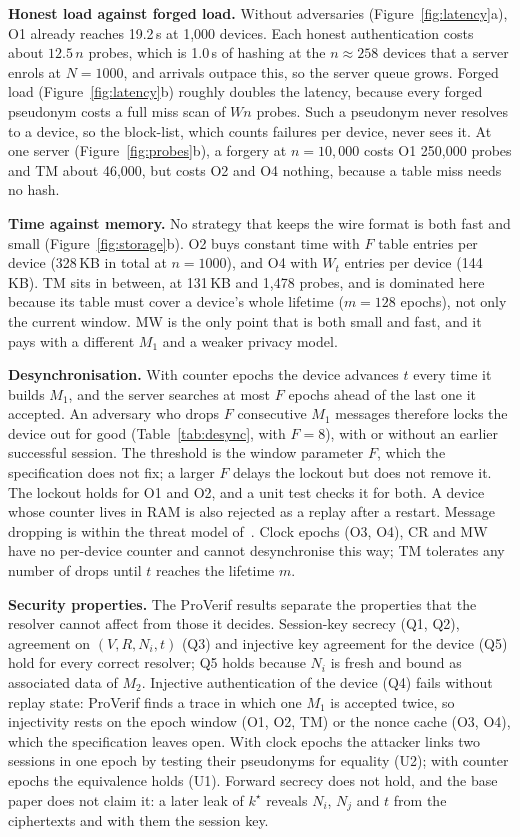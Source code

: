 \textbf{Honest load against forged load.} Without adversaries (Figure~\ref{fig:latency}a), O1 already reaches 19.2\,s at 1,000 devices. Each honest authentication costs about $12.5\,n$ probes, which is 1.0\,s of hashing at the $n\approx258$ devices that a server enrols at $N=1000$, and arrivals outpace this, so the server queue grows. Forged load (Figure~\ref{fig:latency}b) roughly doubles the latency, because every forged pseudonym costs a full miss scan of $Wn$ probes. Such a pseudonym never resolves to a device, so the block-list, which counts failures per device, never sees it. At one server (Figure~\ref{fig:probes}b), a forgery at $n=10{,}000$ costs O1 250,000 probes and TM about 46,000, but costs O2 and O4 nothing, because a table miss needs no hash.

\textbf{Time against memory.} No strategy that keeps the wire format is both fast and small (Figure~\ref{fig:storage}b). O2 buys constant time with $F$ table entries per device (328\,KB in total at $n=1000$), and O4 with $W_t$ entries per device (144\,KB). TM sits in between, at 131\,KB and 1,478 probes, and is dominated here because its table must cover a device's whole lifetime ($m=128$ epochs), not only the current window. MW is the only point that is both small and fast, and it pays with a different $M_1$ and a weaker privacy model.

\textbf{Desynchronisation.} With counter epochs the device advances $t$ every time it builds $M_1$, and the server searches at most $F$ epochs ahead of the last one it accepted. An adversary who drops $F$ consecutive $M_1$ messages therefore locks the device out for good (Table~\ref{tab:desync}, with $F=8$), with or without an earlier successful session. The threshold is the window parameter $F$, which the specification does not fix; a larger $F$ delays the lockout but does not remove it. The lockout holds for O1 and O2, and a unit test checks it for both. A device whose counter lives in RAM is also rejected as a replay after a restart. Message dropping is within the threat model of~\cite{base}. Clock epochs (O3, O4), CR and MW have no per-device counter and cannot desynchronise this way; TM tolerates any number of drops until $t$ reaches the lifetime $m$.

\textbf{Security properties.} The ProVerif results separate the properties that the resolver cannot affect from those it decides. Session-key secrecy (Q1, Q2), agreement on $(V,R,N_i,t)$ (Q3) and injective key agreement for the device (Q5) hold for every correct resolver; Q5 holds because $N_i$ is fresh and bound as associated data of $M_2$. Injective authentication of the device (Q4) fails without replay state: ProVerif finds a trace in which one $M_1$ is accepted twice, so injectivity rests on the epoch window (O1, O2, TM) or the nonce cache (O3, O4), which the specification leaves open. With clock epochs the attacker links two sessions in one epoch by testing their pseudonyms for equality (U2); with counter epochs the equivalence holds (U1). Forward secrecy does not hold, and the base paper does not claim it: a later leak of $k^\star$ reveals $N_i$, $N_j$ and $t$ from the ciphertexts and with them the session key.

